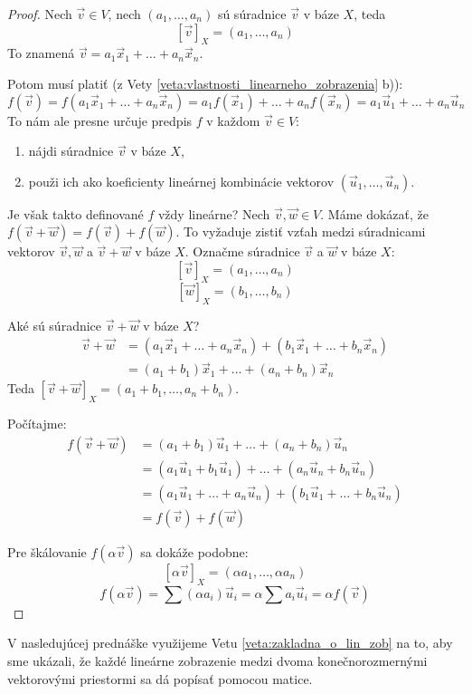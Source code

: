 \begin{proof}
Nech $\vec{v} \in V$, nech $(a_1, \dots, a_n)$ sú súradnice $\vec{v}$ v báze $X$, teda
$$ [\vec{v}]_X = (a_1, \dots, a_n) $$
To znamená $\vec{v} = a_1 \vec{x}_1 + \dots + a_n \vec{x}_n$.

Potom musí platiť (z Vety \ref{veta:vlastnosti_linearneho_zobrazenia} b)):
$$ f(\vec{v}) = f(a_1 \vec{x}_1 + \dots + a_n \vec{x}_n) = a_1 f(\vec{x}_1) + \dots + a_n f(\vec{x}_n) = a_1 \vec{u}_1 + \dots + a_n \vec{u}_n $$
To nám ale presne určuje predpis $f$ v každom $\vec{v} \in V$:
\begin{enumerate}
    \item nájdi súradnice $\vec{v}$ v báze $X$,
    \item použi ich ako koeficienty lineárnej kombinácie vektorov $(\vec{u}_1, \dots, \vec{u}_n)$.
\end{enumerate}

Je však takto definované $f$ vždy lineárne? Nech $\vec{v}, \vec{w} \in V$. Máme dokázať, že $f(\vec{v} + \vec{w}) = f(\vec{v}) + f(\vec{w})$.
To vyžaduje zistiť vzťah medzi súradnicami vektorov $\vec{v}, \vec{w}$ a $\vec{v} + \vec{w}$ v báze $X$. Označme súradnice $\vec{v}$ a $\vec{w}$ v báze $X$:
$$ [\vec{v}]_X = (a_1, \dots, a_n) $$
$$ [\vec{w}]_X = (b_1, \dots, b_n) $$

Aké sú súradnice $\vec{v} + \vec{w}$ v báze $X$?
\begin{align*}
\vec{v} + \vec{w} &= (a_1 \vec{x}_1 + \dots + a_n \vec{x}_n) + (b_1 \vec{x}_1 + \dots + b_n \vec{x}_n) \\
&= (a_1 + b_1)\vec{x}_1 + \dots + (a_n + b_n)\vec{x}_n
\end{align*}
Teda $[\vec{v} + \vec{w}]_X = (a_1 + b_1, \dots, a_n + b_n)$.

Počítajme:
\begin{align*}
f(\vec{v} + \vec{w}) &= (a_1 + b_1)\vec{u}_1 + \dots + (a_n + b_n)\vec{u}_n \\
&= (a_1 \vec{u}_1 + b_1 \vec{u}_1) + \dots + (a_n \vec{u}_n + b_n \vec{u}_n) \\
&= (a_1 \vec{u}_1 + \dots + a_n \vec{u}_n) + (b_1 \vec{u}_1 + \dots + b_n \vec{u}_n) \\
&= f(\vec{v}) + f(\vec{w})
\end{align*}

Pre škálovanie $f(\alpha \vec{v})$ sa dokáže podobne:
$$ [\alpha \vec{v}]_X = (\alpha a_1, \dots, \alpha a_n) $$
$$ f(\alpha \vec{v}) = \sum (\alpha a_i)\vec{u}_i = \alpha \sum a_i \vec{u}_i = \alpha f(\vec{v}) $$
\end{proof}

V nasledujúcej prednáške využijeme Vetu \ref{veta:zakladna_o_lin_zob} na to, aby sme ukázali, že každé lineárne zobrazenie medzi dvoma konečnorozmernými vektorovými priestormi sa dá popísať pomocou matice.
